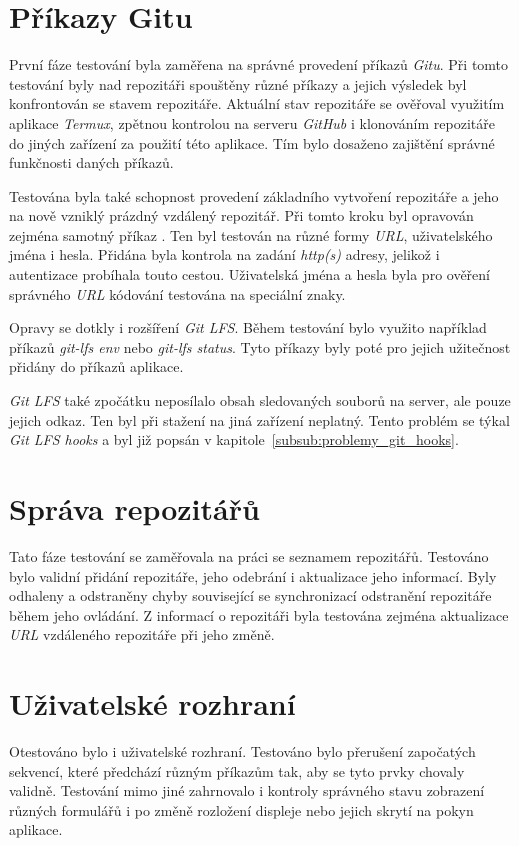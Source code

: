 \section{Příkazy Gitu}
První fáze testování byla zaměřena na správné provedení příkazů \emph{Gitu}. Při tomto testování byly nad repozitáři spouštěny různé příkazy a jejich výsledek byl konfrontován se stavem repozitáře. Aktuální stav repozitáře se ověřoval využitím aplikace \emph{Termux}, zpětnou kontrolou na serveru \emph{GitHub} i klonováním repozitáře do jiných zařízení za použití této aplikace. Tím bylo dosaženo zajištění správné funkčnosti daných příkazů.

Testována byla také schopnost provedení základního vytvoření repozitáře a jeho  na nově vzniklý prázdný vzdálený repozitář. Při tomto kroku byl opravován zejména samotný příkaz . Ten byl testován na různé formy \emph{URL}, uživatelského jména i hesla. Přidána byla kontrola na zadání \emph{http(s)} adresy, jelikož i autentizace probíhala touto cestou. Uživatelská jména a hesla byla pro ověření správného \emph{URL} kódování testována na speciální znaky.

Opravy se dotkly i rozšíření \emph{Git LFS}. Během testování bylo využito například příkazů \emph{git-lfs env} nebo \emph{git-lfs status}. Tyto příkazy byly poté pro jejich užitečnost přidány do příkazů aplikace.

\emph{Git LFS} také zpočátku neposílalo obsah sledovaných souborů na server, ale pouze jejich odkaz. Ten byl při stažení na jiná zařízení neplatný. Tento problém se týkal \emph{Git LFS hooks} a byl již popsán v kapitole~\ref{subsub:problemy_git_hooks}.

\section{Správa repozitářů}
Tato fáze testování se zaměřovala na práci se seznamem repozitářů. Testováno bylo validní přidání repozitáře, jeho odebrání i aktualizace jeho informací. Byly odhaleny a odstraněny chyby související se synchronizací odstranění repozitáře během jeho ovládání. Z informací o repozitáři byla testována zejména aktualizace \emph{URL} vzdáleného repozitáře při jeho změně.

\newpage
\section{Uživatelské rozhraní}
Otestováno bylo i uživatelské rozhraní. Testováno bylo přerušení započatých sekvencí, které předchází různým příkazům tak, aby se tyto prvky chovaly validně. Testování mimo jiné zahrnovalo i kontroly správného stavu zobrazení různých formulářů i po změně rozložení displeje nebo jejich skrytí na pokyn aplikace.


